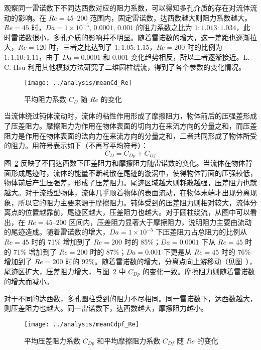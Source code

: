 观察同一雷诺数下不同达西数对应的阻力系数，可以得知多孔介质的存在对流体流动的影响。在 $Re=45$--$200$ 范围内，固定雷诺数，达西数越大则阻力系数越大。$Re=45$ 时，$Da=1\times 10^{-5},\,0.0001,\,0.001$ 的阻力系数之比为 $1:1.013:1.034$，此时雷诺数很小，多孔介质的影响并不明显。随着雷诺数的增大，这一差距也逐渐拉大，$Re=120$ 时，三者之比达到了 $1:1.05:1.15$，$Re=200$ 时的比例为 $1:1.10:1.11$，由于 $Da=0.0001$ 和 0.001 变化趋势相反，所以二者逐渐接近。L.-C. Hsu\cite{Hsu2016} 利用其他模拟方法研究了二维圆柱绕流，得到了各个参数的变化情况。%

\begin{figure}
	\centering
	\texttt{[image: ../analysis/meanCd\_Re]}
	\caption{平均阻力系数 $C_D$ 随 $Re$ 的变化}
	\label{fig: meanCd}
\end{figure}

当流体绕过钝体流动时，流体的粘性作用形成了摩擦阻力，物体前后的压强差形成了压差阻力。摩擦阻力为作用在物体表面的切向力在来流方向的分量之和，而压差阻力是作用在物体表面的法向力在来流方向的分量之和，二者共同形成了物体所受的阻力。用符号表示如下（不再写平均符号）：
\begin{equation}
	C_D = C_{Dp} + C_{Df}
\end{equation}
图~\ref{fig: meanCdpf} 反映了不同达西数下压差阻力和摩擦阻力随雷诺数的变化。当流体在物体背面形成尾迹时，流体的能量不断耗散在尾迹的漩涡中，使得物体背面的压强较低，物体前后产生压强差，形成了压差阻力。尾迹区域越大则耗散越强，压差阻力也就越大。对于流线型物体，流体几乎顺着物体的表面流动，在物体末端才出现分离现象，所以它的阻力主要来源于摩擦阻力。钝体受到的压差阻力则相对较大，流体分离点的位置越靠前，尾迹区越大，压差阻力也越大。对于圆柱绕流，从图中可以看出，在 $Re=45$--$200$ 区间内，压差阻力显著大于摩擦阻力，说明阻力主要由流动的尾迹造成。随着雷诺数的增大，$Da=1\times 10^{-5}$ 下压差阻力占总阻力的比例从 $Re=45$ 时的 71\% 增加到了 $Re=200$ 时的 85\%；$Da=0.0001$ 下从 $Re=45$ 时的 71\% 增加到了 $Re=200$ 时的 87\%；$Da=0.001$ 下更是从 $Re=45$ 时的 76\% 增加到了 $Re=200$ 时的 92\%。随着雷诺数的增大，分离点向上游移动（见图~），尾迹区扩大，压差阻力增大，与图~\ref{fig: meanCdpf} 中 $C_{Dp}$ 的变化一致。摩擦阻力则随着雷诺数的增大而减小。%

对于不同的达西数，多孔圆柱受到的阻力不尽相同。同一雷诺数下，达西数越大，则压差阻力也越大。同一雷诺数下，达西数越大，摩擦阻力越小。%

\begin{figure}
	\centering
	\texttt{[image: ../analysis/meanCdpf\_Re]}
	\caption{平均压差阻力系数 $C_{Dp}$ 和平均摩擦阻力系数 $C_{Df}$ 随 $Re$ 的变化}
	\label{fig: meanCdpf}
\end{figure}

